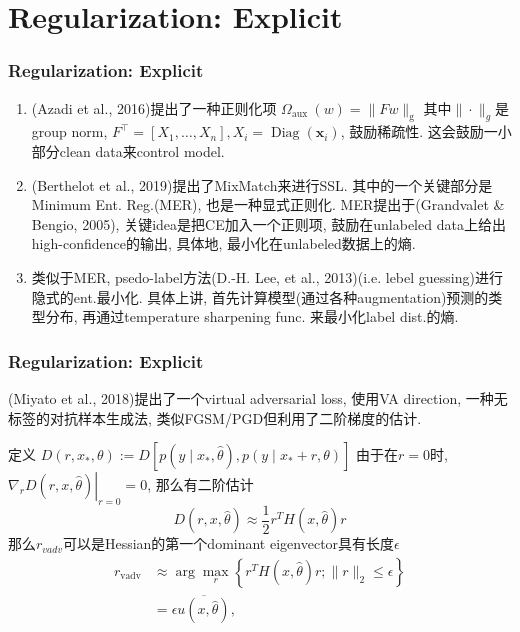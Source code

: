 \documentclass{beamer}
\newcommand{\bs}[1]{\boldsymbol{#1}}
\begin{document}
\section{Regularization: Explicit}

\begin{frame}
    \frametitle{Regularization: Explicit}

    \begin{enumerate}
        \item (Azadi et al., 2016)提出了一种正则化项
        $\Omega_{\text {aux }}(w)=\|F w\|_{\mathrm{g}}$
        其中$\|\cdot\|_{g}$是group norm,
        $F^{\top}=\left[X_{1}, \ldots, X_{n}\right], X_i=\operatorname{Diag}(\bs x_i)$,
        鼓励稀疏性. 这会鼓励一小部分clean data来control model.
        \item (Berthelot et al., 2019)提出了MixMatch来进行SSL. 其中的一个关键部分是Minimum Ent. Reg.(MER), 也是一种显式正则化. MER提出于(Grandvalet \&  Bengio, 2005), 关键idea是把CE加入一个正则项, 鼓励在unlabeled data上给出high-confidence的输出, 具体地, 最小化在unlabeled数据上的熵.
        \item 类似于MER, psedo-label方法(D.-H.   Lee, et al., 2013)(i.e. lebel guessing)进行隐式的ent.最小化. 具体上讲, 首先计算模型(通过各种augmentation)预测的类型分布, 再通过temperature sharpening func. 来最小化label dist.的熵.
    \end{enumerate}

\end{frame}

\begin{frame}
    \frametitle{Regularization: Explicit}

    (Miyato et al., 2018)提出了一个virtual adversarial loss, 使用VA direction, 一种无标签的对抗样本生成法, 类似FGSM/PGD但利用了二阶梯度的估计.

    定义
    $D\left(r, x_{*}, \theta\right) := D\left[p\left(y \mid x_{*}, \hat{\theta}\right), p\left(y \mid x_{*}+r, \theta\right)\right]$
    由于在$r=0$时, $\left.\nabla_{r} D(r, x, \hat{\theta})\right|_{r=0}=0$, 那么有二阶估计
    \begin{equation}
        D(r, x, \hat{\theta}) \approx \frac{1}{2} r^{T} H(x, \hat{\theta}) r
    \end{equation}
    那么$r_{vadv}$可以是Hessian的第一个dominant eigenvector具有长度$\epsilon$
    \begin{equation}
        \begin{aligned}
        r_{\mathrm{vadv}} & \approx \arg \max _{r}\left\{r^{T} H(x, \hat{\theta}) r ;\|r\|_{2} \leq \epsilon\right\} \\
        &=\epsilon \overline{u(x, \hat{\theta})},
        \end{aligned}
    \end{equation}
    

\end{frame}
\end{document}
